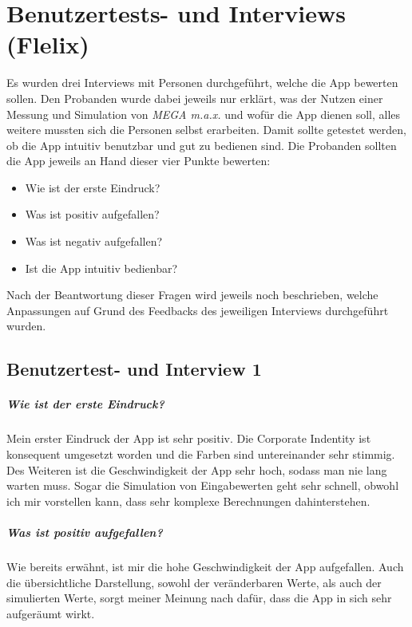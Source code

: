 \chapter{Benutzertests- und Interviews (Flelix)}
\label{chap:flinterviews}

	Es wurden drei Interviews mit Personen durchgeführt, welche die App bewerten sollen. Den Probanden wurde dabei jeweils nur erklärt, was der Nutzen einer Messung und Simulation von \textit{MEGA m.a.x.} und wofür die App dienen soll, alles weitere mussten sich die Personen selbst erarbeiten. Damit sollte getestet werden, ob die App intuitiv benutzbar und gut zu bedienen sind. Die Probanden sollten die App jeweils an Hand dieser vier Punkte bewerten:
	\begin{itemize}
		\item Wie ist der erste Eindruck?
		\item Was ist positiv aufgefallen?
		\item Was ist negativ aufgefallen?
		\item Ist die App intuitiv bedienbar?
	\end{itemize}

	Nach der Beantwortung dieser Fragen wird jeweils noch beschrieben, welche Anpassungen auf Grund des Feedbacks des jeweiligen Interviews durchgeführt wurden.

	\section{Benutzertest- und Interview 1}
	\label{sec:flinterview1}
	
	\paragraph{Wie ist der erste Eindruck?}
	
		Mein erster Eindruck der App ist sehr positiv. Die Corporate Indentity ist konsequent umgesetzt worden und die Farben sind untereinander sehr stimmig. Des Weiteren ist die Geschwindigkeit der App sehr hoch, sodass man nie lang warten muss. Sogar die Simulation von Eingabewerten geht sehr schnell, obwohl ich mir vorstellen kann, dass sehr komplexe Berechnungen dahinterstehen.
	
	\paragraph{Was ist positiv aufgefallen?}
		
		Wie bereits erwähnt, ist mir die hohe Geschwindigkeit der App aufgefallen. Auch die übersichtliche Darstellung, sowohl der veränderbaren Werte, als auch der simulierten Werte, sorgt meiner Meinung nach dafür, dass die App in sich sehr aufgeräumt wirkt.
	
